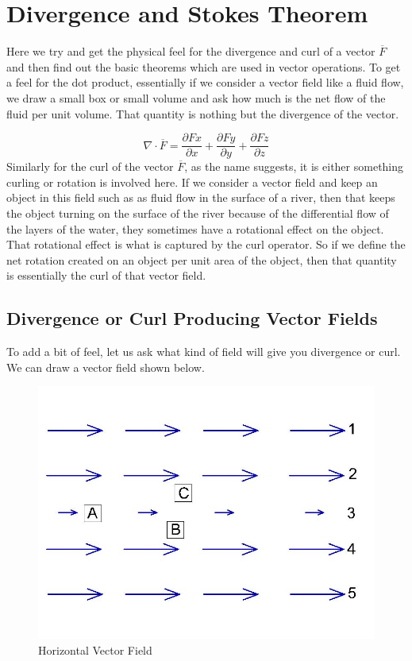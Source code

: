 \chapter{Divergence and Stokes Theorem}
Here we try and get the physical feel for the divergence and curl of a vector $\overline{F}$  and then find out the basic theorems which are used in vector operations.
To get a feel for the dot product, essentially if we consider a vector field like a fluid flow, we draw a small box or small volume and ask how much is the net flow of the fluid per unit volume. That quantity is nothing but the divergence of the vector.

\begin{equation}
\nabla\cdot \overline{F} = \frac{\partial Fx}{\partial x} + \frac{\partial Fy}{\partial y} + \frac{\partial Fz}{\partial z}	
\end{equation}
Similarly for the curl of the vector $\overline{F}$, as the name suggests, it is either something curling or rotation is involved here. If we consider a vector field and keep an object in this field such as as fluid flow in the surface of a river, then that keeps the object turning on the surface of the river because of the differential flow of the layers of the water, they sometimes have a rotational effect on the object. That rotational effect is what is captured by the curl operator. So if we define the net rotation created on an object per unit area of the object, then that quantity is essentially the curl of that vector field.

\section{Divergence or Curl Producing Vector Fields}
To add a bit of feel, let us ask what kind of field will give you divergence or curl. We can draw a vector field shown below.
\begin{figure}[h]
\centering
\includegraphics[width=1\linewidth]{./graphics/fig171}
\caption{Horizontal Vector Field}
\end{figure}

